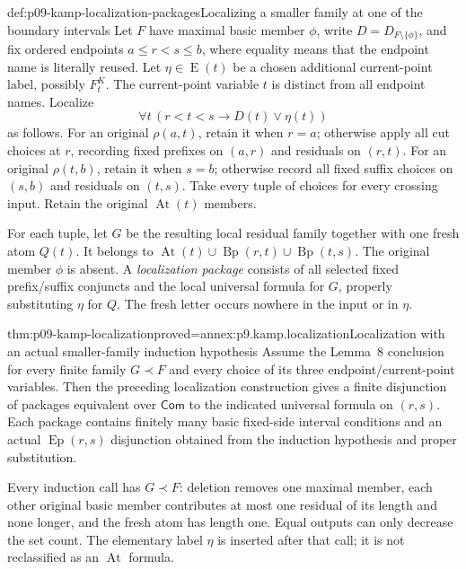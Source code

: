 \begin{hbdefinition}{def:p09-kamp-localization-packages}{Localizing a smaller family at one of the boundary intervals}
Let \(F\) have maximal basic member \(\phi\), write
\(D=D_{F\setminus\{\phi\}}\), and fix ordered endpoints
\(a\leq r<s\leq b\), where equality means that the endpoint
name is literally reused. Let \(\eta\in\operatorname{E}(t)\)
be a chosen additional current-point label, possibly \(F^K_t\).
The current-point variable \(t\) is distinct from all endpoint names.
Localize
\[
             \forall t\,(r<t<s\to D(t)\lor\eta(t))
\]
as follows. For an original \(\rho(a,t)\), retain it when
\(r=a\); otherwise apply all cut choices at \(r\), recording
fixed prefixes on \((a,r)\) and residuals on \((r,t)\).
For an original \(\rho(t,b)\), retain it when \(s=b\);
otherwise record all fixed suffix choices on \((s,b)\) and
residuals on \((t,s)\). Take every tuple of choices for every
crossing input. Retain the original \(\operatorname{At}(t)\)
members.

For each tuple, let \(G\) be the resulting local residual family
together with one fresh atom \(Q(t)\). It belongs to
\(\operatorname{At}(t)\cup\operatorname{Bp}(r,t)\cup
\operatorname{Bp}(t,s)\). The original member \(\phi\) is
absent. A \emph{localization package} consists of all selected
fixed prefix/suffix conjuncts and the local universal formula for
\(G\), properly substituting \(\eta\) for \(Q\).
The fresh letter occurs nowhere in the input or in \(\eta\).
\end{hbdefinition}

\begin{hblemma}{thm:p09-kamp-localization}{proved=annex:p9.kamp.localization}{Localization with an actual smaller-family induction hypothesis}
Assume the Lemma~8 conclusion for every finite family \(G\prec F\)
and every choice of its three endpoint/current-point variables.
Then the preceding localization construction gives a finite disjunction
of packages equivalent over \(\mathsf{Com}\) to the indicated
universal formula on \((r,s)\). Each package contains finitely
many basic fixed-side interval conditions and an actual
\(\operatorname{Ep}(r,s)\) disjunction obtained from the
induction hypothesis and proper substitution.

Every induction call has \(G\prec F\): deletion removes one
maximal member, each other original basic member contributes at most
one residual of its length and none longer, and the fresh atom has
length one. Equal outputs can only decrease the set count. The
elementary label \(\eta\) is inserted after that call; it is
not reclassified as an \(\operatorname{At}\) formula.
\end{hblemma}

